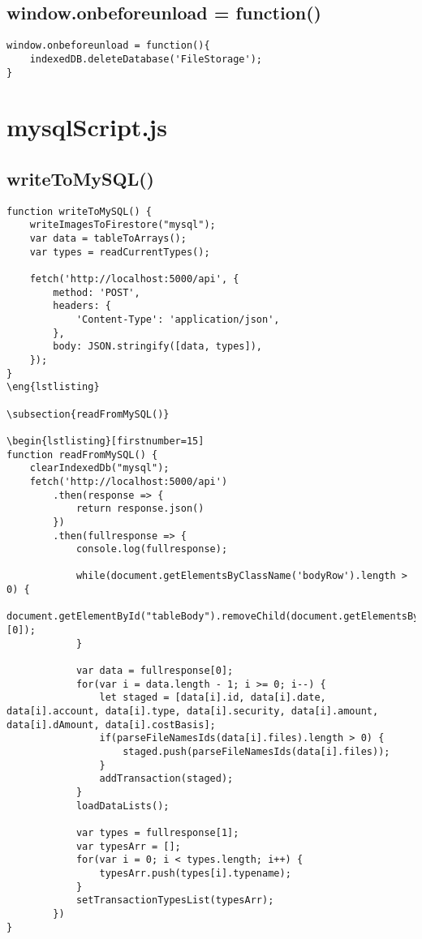 \documentclass[letterpaper]{article}
\begin{document}
\subsection{window.onbeforeunload = function()}

\begin{lstlisting}[firstnumber=1]
window.onbeforeunload = function(){
    indexedDB.deleteDatabase('FileStorage');
}
\end{lstlisting}

\newpage

\section{mysqlScript.js}

\subsection{writeToMySQL()}

\begin{lstlisting}[firstnumber=1]
function writeToMySQL() {
    writeImagesToFirestore("mysql");
    var data = tableToArrays();
    var types = readCurrentTypes();

    fetch('http://localhost:5000/api', {
        method: 'POST',
        headers: {
            'Content-Type': 'application/json',
        },
        body: JSON.stringify([data, types]),
    });
}
\eng{lstlisting}

\subsection{readFromMySQL()}

\begin{lstlisting}[firstnumber=15]
function readFromMySQL() {
    clearIndexedDb("mysql");
    fetch('http://localhost:5000/api')
        .then(response => {
            return response.json()
        })
        .then(fullresponse => {
            console.log(fullresponse);

            while(document.getElementsByClassName('bodyRow').length > 0) {
                document.getElementById("tableBody").removeChild(document.getElementsByClassName('bodyRow')[0]);
            }

            var data = fullresponse[0];
            for(var i = data.length - 1; i >= 0; i--) {
                let staged = [data[i].id, data[i].date, data[i].account, data[i].type, data[i].security, data[i].amount, data[i].dAmount, data[i].costBasis];
                if(parseFileNamesIds(data[i].files).length > 0) {
                    staged.push(parseFileNamesIds(data[i].files));
                }
                addTransaction(staged);
            }
            loadDataLists();

            var types = fullresponse[1];
            var typesArr = [];
            for(var i = 0; i < types.length; i++) {
                typesArr.push(types[i].typename);
            }
            setTransactionTypesList(typesArr);
        })
}
\end{lstlisting}
\end{document}
